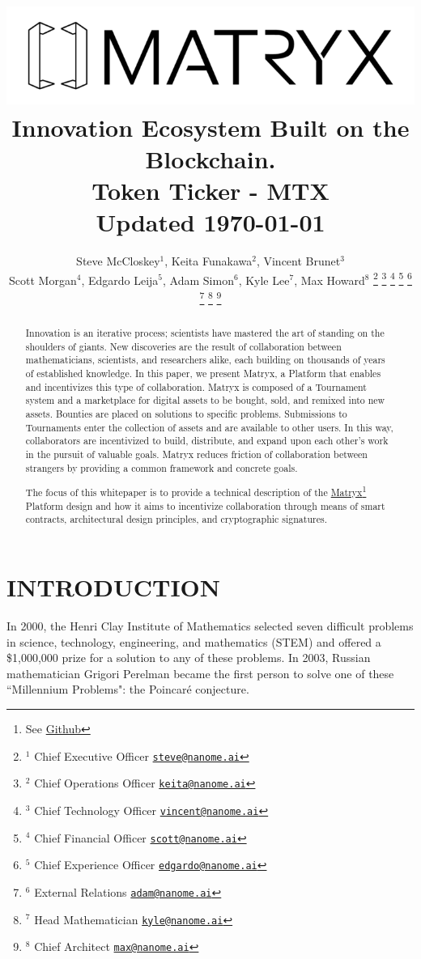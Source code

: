 \documentclass[a4paper, 10pt, conference]{ieeeconf}      %
\title{ \includegraphics[scale=.5]{logo.png}  \\
\large Innovation Ecosystem Built on the Blockchain. \\ Token Ticker - MTX \\ Updated \today
}
\author{Steve McCloskey$^{1}$, Keita Funakawa$^{2}$, Vincent Brunet$^{3}$ \\
Scott Morgan$^{4}$, Edgardo Leija$^{5}$, Adam Simon$^{6}$, Kyle Lee$^{7}$, Max Howard$^{8}$
\thanks{$^{1}$ Chief Executive Officer 
        {\tt\small \href{mailto: steve@nanome.ai}{steve@nanome.ai}}}%
\thanks{$^{2}$ Chief Operations Officer
        {\tt\small \href{mailto: keita@nanome.ai}{keita@nanome.ai}}}%
\thanks{$^{3}$ Chief Technology Officer
        {\tt\small \href{mailto: vincent@nanome.ai}{vincent@nanome.ai}}}%
\thanks{$^{4}$ Chief Financial Officer
        {\tt\small \href{mailto: scott@nanome.ai}{scott@nanome.ai}}}%
\thanks{$^{5}$ Chief Experience Officer
        {\tt\small \href{mailto: edgardo@nanome.ai}{edgardo@nanome.ai}}}%
\thanks{$^{6}$ External Relations
        {\tt\small \href{mailto: adam@nanome.ai}{adam@nanome.ai}}}%
\thanks{$^{7}$ Head Mathematician
        {\tt\small \href{mailto: kyle@nanome.ai}{kyle@nanome.ai}}}%
\thanks{$^{8}$ Chief Architect
        {\tt\small \href{mailto:
        max@nanome.ai}{max@nanome.ai}}}%
}
\begin{document}
\maketitle
\thispagestyle{empty}
\pagestyle{empty}


\begin{abstract}

Innovation is an iterative process; scientists have mastered the art of standing on the shoulders of giants. 
New discoveries are the result of collaboration between mathematicians, scientists, and researchers alike, each building on thousands of years of established knowledge. 
In this paper, we present Matryx, a Platform that enables and incentivizes this type of collaboration. 
Matryx is composed of a Tournament system and a marketplace for digital assets to be bought, sold, and remixed into new assets. 
Bounties are placed on solutions to specific problems. 
Submissions to Tournaments enter the collection of assets and are available to other users.
In this way, collaborators are incentivized to build, distribute, and expand upon each other’s work in the pursuit of valuable goals. 
Matryx reduces friction of collaboration between strangers by providing a common framework and concrete goals. 

The focus of this whitepaper is to provide a technical description of the \href{https://github.com/matryx/MatryxPlatform}{Matryx}\footnote{See \href{https://github.com/matryx/MatryxPlatform}{Github}} Platform design and how it aims to incentivize collaboration through means of smart contracts, architectural design principles, and cryptographic signatures.

\end{abstract}


\section{INTRODUCTION}\label{intro}
In 2000, the Henri Clay Institute of Mathematics selected seven difficult problems in science, technology, engineering, and mathematics (STEM) and offered a \$1,000,000 prize for a solution to any of these problems. 
In 2003, Russian mathematician Grigori Perelman became the first person to solve one of these ``Millennium Problems": the Poincaré conjecture.
\end{document}
